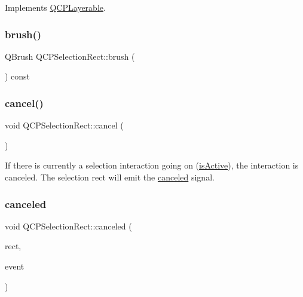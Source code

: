 Implements \mbox{\hyperlink{class_q_c_p_layerable_afdf83ddc6a265cbf4c89fe99d3d93473}{Q\+C\+P\+Layerable}}.

\mbox{\label{class_q_c_p_selection_rect_a9669c77c5796dea9dc089a088d50ebfb}} 
\subsubsection{\texorpdfstring{brush()}{brush()}}
{\footnotesize\ttfamily Q\+Brush Q\+C\+P\+Selection\+Rect\+::brush (\begin{DoxyParamCaption}{ }\end{DoxyParamCaption}) const\hspace{0.3cm}{\ttfamily [inline]}}

\mbox{\label{class_q_c_p_selection_rect_af67bc58f4f5ce9a4dc420b9c42de235a}} 
\subsubsection{\texorpdfstring{cancel()}{cancel()}}
{\footnotesize\ttfamily void Q\+C\+P\+Selection\+Rect\+::cancel (\begin{DoxyParamCaption}{ }\end{DoxyParamCaption})}

If there is currently a selection interaction going on (\mbox{\hyperlink{class_q_c_p_selection_rect_ad27c1569c6ea8fa48e24b81e2a302df3}{is\+Active}}), the interaction is canceled. The selection rect will emit the \mbox{\hyperlink{class_q_c_p_selection_rect_aeb82009393c90130102dccf36477b906}{canceled}} signal. \mbox{\label{class_q_c_p_selection_rect_aeb82009393c90130102dccf36477b906}} 
\subsubsection{\texorpdfstring{canceled}{canceled}}
{\footnotesize\ttfamily void Q\+C\+P\+Selection\+Rect\+::canceled (\begin{DoxyParamCaption}\item[{const Q\+Rect \&}]{rect,  }\item[{Q\+Input\+Event $\ast$}]{event }\end{DoxyParamCaption})\hspace{0.3cm}{\ttfamily [signal]}}

